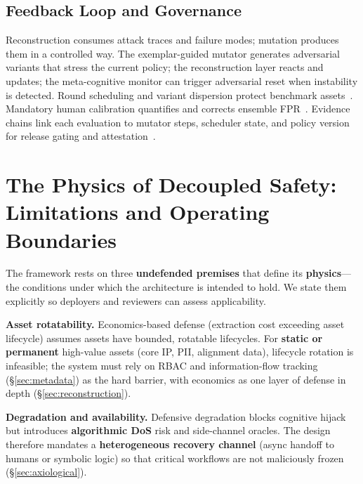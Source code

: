 \documentclass[letterpaper,twocolumn,10pt]{article}
\begin{document}


\subsection{Feedback Loop and Governance}

Reconstruction consumes attack traces and failure modes; mutation produces them in a controlled way. The exemplar-guided mutator generates adversarial variants that stress the current policy; the reconstruction layer reacts and updates; the meta-cognitive monitor can trigger adversarial reset when instability is detected. Round scheduling and variant dispersion protect benchmark assets~\cite{ControlledMutation_SafetyEval}. Mandatory human calibration quantifies and corrects ensemble FPR~\cite{tc260-governance}. Evidence chains link each evaluation to mutator steps, scheduler state, and policy version for release gating and attestation~\cite{dual-use-attestations,ControlledMutation_SafetyEval}.

\section{The Physics of Decoupled Safety: Limitations and Operating Boundaries}
\label{sec:physics}

The framework rests on three \textbf{undefended premises} that define its \textbf{physics}---the conditions under which the architecture is intended to hold. We state them explicitly so deployers and reviewers can assess applicability.

\textbf{Asset rotatability.} Economics-based defense (extraction cost exceeding asset lifecycle) assumes assets have bounded, rotatable lifecycles. For \textbf{static or permanent} high-value assets (core IP, PII, alignment data), lifecycle rotation is infeasible; the system must rely on RBAC and information-flow tracking (\S\ref{sec:metadata}) as the hard barrier, with economics as one layer of defense in depth (\S\ref{sec:reconstruction}).

\textbf{Degradation and availability.} Defensive degradation blocks cognitive hijack but introduces \textbf{algorithmic DoS} risk and side-channel oracles. The design therefore mandates a \textbf{heterogeneous recovery channel} (async handoff to humans or symbolic logic) so that critical workflows are not maliciously frozen (\S\ref{sec:axiological}).
\end{document}
